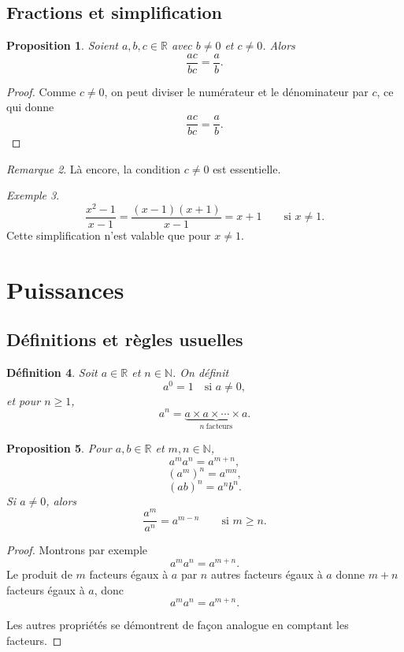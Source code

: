 \documentclass[11pt,a4paper]{article}
\newtheorem{definition}{Définition}[section]
\newtheorem{proposition}[definition]{Proposition}
\theoremstyle{remark}
\newtheorem{remarque}[definition]{Remarque}
\newtheorem{exemple}[definition]{Exemple}
\newcommand{\R}{\mathbb{R}}
\newcommand{\N}{\mathbb{N}}
\begin{document}
\subsection{Fractions et simplification}

\begin{proposition}
Soient \(a,b,c\in\R\) avec \(b\neq 0\) et \(c\neq 0\). Alors
\[
\frac{ac}{bc}=\frac{a}{b}.
\]
\end{proposition}

\begin{proof}
Comme \(c\neq 0\), on peut diviser le numérateur et le dénominateur par \(c\), ce qui donne
\[
\frac{ac}{bc}=\frac{a}{b}.
\]
\end{proof}

\begin{remarque}
Là encore, la condition \(c\neq 0\) est essentielle.
\end{remarque}

\begin{exemple}
\[
\frac{x^2-1}{x-1}
=
\frac{(x-1)(x+1)}{x-1}
=
x+1
\qquad \text{si } x\neq 1.
\]
Cette simplification n’est valable que pour \(x\neq 1\).
\end{exemple}

\section{Puissances}

\subsection{Définitions et règles usuelles}

\begin{definition}
Soit \(a\in\R\) et \(n\in\N\). On définit
\[
a^0=1 \quad \text{si } a\neq 0,
\]
et pour \(n\geq 1\),
\[
a^n=\underbrace{a\times a\times \cdots \times a}_{n\ \text{facteurs}}.
\]
\end{definition}

\begin{proposition}
Pour \(a,b\in\R\) et \(m,n\in\N\),
\[
a^m a^n=a^{m+n},
\]
\[
(a^m)^n=a^{mn},
\]
\[
(ab)^n=a^n b^n.
\]
Si \(a\neq 0\), alors
\[
\frac{a^m}{a^n}=a^{m-n}
\qquad \text{si } m\geq n.
\]
\end{proposition}

\begin{proof}
Montrons par exemple
\[
a^m a^n=a^{m+n}.
\]
Le produit de \(m\) facteurs égaux à \(a\) par \(n\) autres facteurs égaux à \(a\) donne \(m+n\) facteurs égaux à \(a\), donc
\[
a^m a^n=a^{m+n}.
\]

Les autres propriétés se démontrent de façon analogue en comptant les facteurs.
\end{proof}
\end{document}

